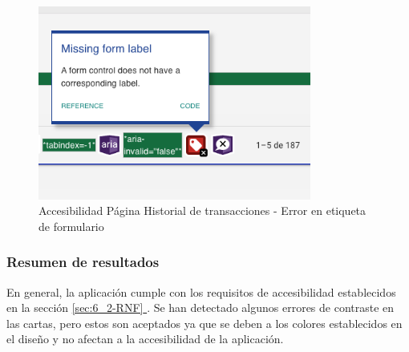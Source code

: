 \begin{figure}[H]
    \centering
    \includegraphics[width=0.8\textwidth]{figures/accesibilidad/A-acc-error-transacciones.png}
    \caption{Accesibilidad Página Historial de transacciones - Error en etiqueta de formulario}
    \label{fig:Acc-Transacciones-errror}
\end{figure}


\subsubsection*{Resumen de resultados}
En general, la aplicación cumple con los requisitos de accesibilidad establecidos en la sección \hyperlink{sec:6_2-RNF}{\ref*{sec:6_2-RNF} }.
Se han detectado algunos errores de contraste en las cartas, pero estos son aceptados ya que se deben a los colores 
establecidos en el diseño y no afectan a la accesibilidad de la aplicación.